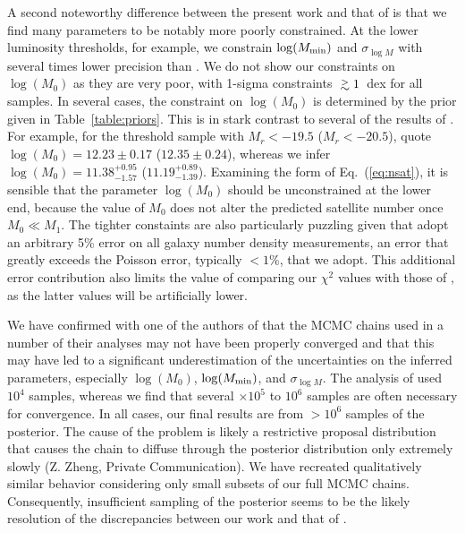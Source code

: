 \documentclass[usenatbib,usegraphicx,letterpaper]{mn2e}
\newcommand{\gsim}{\lower0.6ex\vbox{\hbox{$ \buildrel{\textstyle >}\over{\sim}\ $}}}
\def\gtsima{$\; \buildrel > \over \sim \;$}
\def\gsim{\lower.7ex\hbox{\gtsima}}
\def\ga{\gsim}
\def\gta{\ga}
\begin{document}
A second noteworthy difference between the present work and that of
\citet{zehavi_etal11} is that we find many parameters to be notably
more poorly constrained. At the lower luminosity thresholds, for
example, we constrain $\log (M_{\rm min})$ and $\sigma_{\log M}$ with
several times lower precision than \citet{zehavi_etal11}. We do not
show our constraints on $\log (M_0)$ as they are very poor, with
1-sigma constraints $\gta 1$~dex for all samples. In several cases,
the constraint on $\log (M_0)$ is determined by the prior given in
Table~\ref{table:priors}. This is in stark contrast to several of the
results of \citet{zehavi_etal11}. For example, for the threshold
sample with $M_r < -19.5$ ($M_r < -20.5$), \citet{zehavi_etal11} quote
$\log (M_0) = 12.23 \pm 0.17$ ($12.35 \pm 0.24$), whereas we infer
$\log (M_0) = 11.38^{+0.95}_{-1.57}$
($11.19^{+0.89}_{-1.39}$). Examining the form of Eq.~(\ref{eq:nsat}),
it is sensible that the parameter $\log (M_0)$ should be unconstrained
at the lower end, because the value of $M_0$ does not alter the
predicted satellite number once $M_0 \ll M_1$. The tighter constaints are also 
particularly puzzling given that \citet{zehavi_etal11} adopt an arbitrary 5\% error on 
all galaxy number density measurements, an error that greatly exceeds the 
Poisson error, typically $< 1\%$, that we adopt. This additional error 
contribution also limits the value of comparing our $\chi^2$ values with those of 
\citet{zehavi_etal11}, as the latter values will be artificially lower. 

We have confirmed with one of the authors of \citet{zehavi_etal11}
that the MCMC chains used in a number of their analyses may not have been
properly converged and that this may have led to a significant underestimation of the
uncertainties on the inferred parameters, especially $\log (M_0)$, $\log (M_{\rm min})$,
and $\sigma_{\log M}$. The analysis of \citet{zehavi_etal11}
used $10^4$ samples, whereas we find that several $\times 10^5$ to $10^6$ 
samples are often necessary for convergence. In all cases, our final results are from 
$>10^6$ samples of the posterior. The cause of the problem is likely a 
restrictive proposal distribution that causes the chain to
diffuse through the posterior distribution only extremely slowly (Z. Zheng, Private Communication). 
We have recreated qualitatively similar behavior considering only small subsets of our full 
MCMC chains. Consequently, insufficient sampling of the posterior seems to be the likely resolution
of the discrepancies between our work and that of \citet{zehavi_etal11}.
\end{document}
